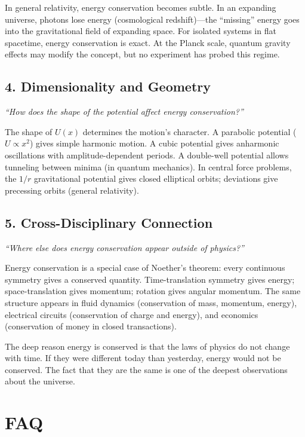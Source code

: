 \documentclass[11pt,openright]{book}
\begin{document}
In general relativity, energy conservation becomes subtle. In an expanding universe, photons lose energy (cosmological redshift)---the ``missing'' energy goes into the gravitational field of expanding space. For isolated systems in flat spacetime, energy conservation is exact. At the Planck scale, quantum gravity effects may modify the concept, but no experiment has probed this regime.

\subsection*{4. Dimensionality and Geometry}
\textit{``How does the shape of the potential affect energy conservation?''}

The shape of $U(x)$ determines the motion's character. A parabolic potential ($U \propto x^2$) gives simple harmonic motion. A cubic potential gives anharmonic oscillations with amplitude-dependent periods. A double-well potential allows tunneling between minima (in quantum mechanics). In central force problems, the $1/r$ gravitational potential gives closed elliptical orbits; deviations give precessing orbits (general relativity).

\subsection*{5. Cross-Disciplinary Connection}
\textit{``Where else does energy conservation appear outside of physics?''}

Energy conservation is a special case of Noether's theorem: every continuous symmetry gives a conserved quantity. Time-translation symmetry gives energy; space-translation gives momentum; rotation gives angular momentum. The same structure appears in fluid dynamics (conservation of mass, momentum, energy), electrical circuits (conservation of charge and energy), and economics (conservation of money in closed transactions).

The deep reason energy is conserved is that the laws of physics do not change with time. If they were different today than yesterday, energy would not be conserved. The fact that they are the same is one of the deepest observations about the universe.


\section*{FAQ}
\end{document}
